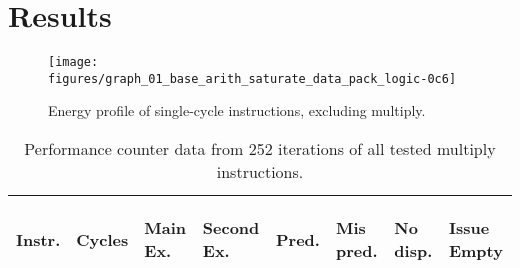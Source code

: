 \section{Results}

%
%
%
%

\begin{figure*}[ht]
    \centering
    \texttt{[image: figures/graph\_01\_base\_arith\_saturate\_data\_pack\_logic-0c6]}
    \caption{Energy profile of single-cycle instructions, excluding multiply.}
    \label{fig:singlecycle}
\end{figure*}


\begin{table}
    \centering
    \begin{tabular}{|p{0.7cm}|R{0.8cm}R{0.6cm}R{0.9cm}R{0.6cm}R{0.6cm}R{0.8cm}R{0.8cm}|}
        \hline
        \centering
        Instr. &
        \centering
        Cycles &
        \centering
        Main Ex. &
        \centering
        Second Ex. &
        \centering
        Pred. &
        \centering
        Mis pred. &
        \centering
        No disp. &
        \begin{centering}
        Issue Empty
        \end{centering}
        \\
        \hline
        
        \hline
    \end{tabular}
    \caption{Performance counter data from 252 iterations of all tested multiply
    instructions.}
    \label{tab:perf_mul}
\end{table}

